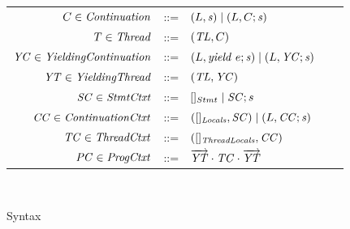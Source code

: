 \begin{figure}
\begin{tabular}{rclcl}
$C \in \mathit{Continuation}$ & ::= & $(L,\mathit{s}) \mid (L, C;\mathit{s})$ \\
$T \in \mathit{Thread}$ & ::=  & $(\mathit{TL}, C)$ \\
$\mathit{YC} \in \mathit{YieldingContinuation}$ & ::= & $(L,\mathit{yield}\ e;\mathit{s}) \mid (L, \mathit{YC};\mathit{s})$ \\
$\mathit{YT} \in \mathit{YieldingThread}$ &::= &$(\mathit{TL}, \mathit{YC})$ \\
$\mathit{SC} \in \mathit{StmtCtxt}$ &::= &$[]_{Stmt} \mid \mathit{SC};s$ \\
$\mathit{CC} \in \mathit{ContinuationCtxt}$ &::= & $([]_{\mathit{Locals}}, \mathit{SC}) \mid (L,\mathit{CC};\mathit{s})$ \\
$\mathit{TC} \in \mathit{ThreadCtxt}$ &::= &$([]_{\mathit{ThreadLocals}}, \mathit{CC})$ \\
$\mathit{PC} \in \mathit{ProgCtxt}$ &::= &$\overrightarrow{\mathit{YT}} \cdot \mathit{TC} \cdot \overrightarrow{\mathit{YT}}$ \\
\end{tabular}\\
\setlength{\tabcolsep}{6pt}
\caption{Syntax}
\label{fig:syntax}
\end{figure}

